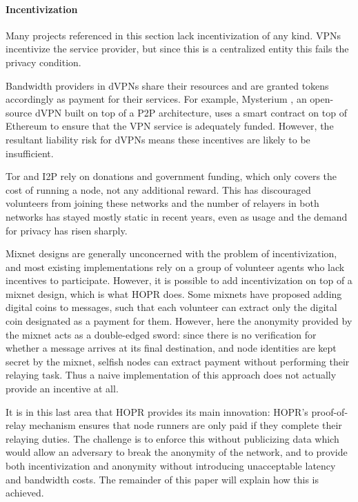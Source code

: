 \paragraph{Incentivization} Many projects referenced in this section lack incentivization of any kind. VPNs incentivize the service provider, but since this is a centralized entity this fails the privacy condition. 

Bandwidth providers in dVPNs share their resources and are granted tokens accordingly as payment for their
services. For example, Mysterium \cite{mysterium}, an open-source dVPN built on top of a P2P architecture, uses a smart contract on top of Ethereum to ensure
that the VPN service is adequately funded. However, the resultant liability risk for dVPNs means these incentives are likely to be insufficient. 

Tor and I2P rely on donations and government funding, which only covers the cost of running a node, not any additional reward. This has discouraged volunteers from joining these networks and the number of relayers in both networks has stayed mostly static in recent years, even as usage and the demand for privacy has risen sharply.

Mixnet designs are generally unconcerned with the problem of incentivization, and most existing implementations rely on a group of volunteer agents who lack incentives to participate. However, it is possible to add incentivization on top of a mixnet design, which is what HOPR does. Some mixnets have proposed adding digital coins to messages, such that each volunteer can extract only the digital coin designated as a payment for them. However, here the anonymity provided by the mixnet acts as a double-edged sword: since there is no verification for whether a message arrives at its final destination, and node identities are kept secret by the mixnet, selfish nodes can extract payment without performing their relaying task. Thus a naive implementation of this approach does not actually provide an incentive at all.

It is in this last area that HOPR provides its main innovation: HOPR's proof-of-relay mechanism ensures that node runners are only paid if they complete their relaying duties. The challenge is to enforce this without publicizing data which would allow an adversary to break the anonymity of the network, and to provide both incentivization and anonymity without introducing unacceptable latency and bandwidth costs. The remainder of this paper will explain how this is achieved. 
